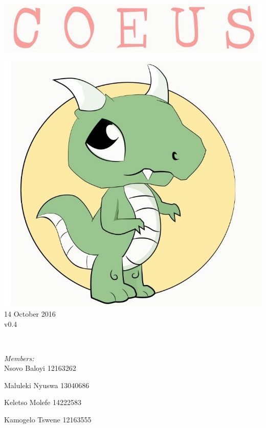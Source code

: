 \documentclass[a4paper,12pt]{article}
\begin{document}
\begin{titlepage}
	\includegraphics[width=\textwidth]{name} \\[1cm]
	\begin{minipage}{0.4\textwidth}
	\begin{flushleft} \large
	\includegraphics[width=\textwidth]{logo} \\[0.5cm]
	{\large 14  October 2016}\\
	{\large v0.4}
	\end{flushleft}
	\end{minipage}
	~
	\begin{minipage}{0.5\textwidth}
	\begin{flushright} \large
	\emph{Members:}\\%
	Nsovo Baloyi 12163262

	Maluleki Nyuswa 13040686
	
	Keletso Molefe 14222583
	
	Kamogelo Tswene 12163555

	\end{flushright}
	\end{minipage}\\[4cm]
\end{titlepage}
\end{document}

